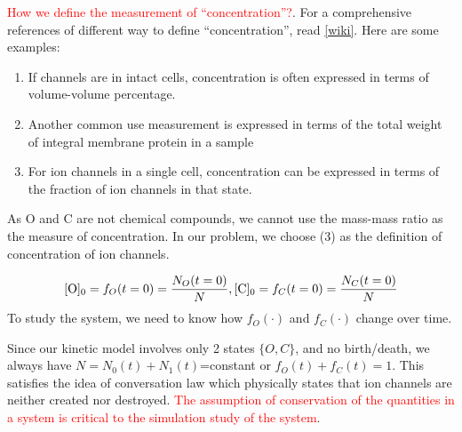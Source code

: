 % 
\begin{framed}
  
  
  \textcolor{red}{How we define the measurement of ``concentration''?}.
  For a comprehensive references of different way to define
  ``concentration'', read
  \href{http://en.wikipedia.org/wiki/Concentration}{[wiki]}. Here are
  some examples:

  \begin{enumerate}
  \item If channels are in intact cells, concentration is often
    expressed in terms of volume-volume percentage.

  \item Another common use measurement is expressed in terms of the
    total weight of integral membrane protein in a sample

  \item For ion channels in a single cell, concentration can be
    expressed in terms of the fraction of ion channels in that
    state.
  \end{enumerate}

\end{framed}

As O and C are not chemical compounds, we cannot use the mass-mass
ratio as the measure of concentration. In our problem, we choose (3)
as the definition of concentration of ion channels. 
% 

\begin{equation}
  \label{eq:9}
  [\text{O}]_0 = f_O(t=0) = \frac{N_O(t=0)}{N}, [{\text{C}}]_0 = f_C(t=0) =
  \frac{N_C(t=0)}{N}
\end{equation}
To study the system, we need to know how $f_O(\cdot)$ and
$f_C(\cdot)$ change over time.

\begin{mdframed}
Since our kinetic model involves only 2 states $\{O,C\}$, and no
birth/death, we always have $N = N_0(t) + N_1(t)$=constant or 
$f_O(t) + f_C(t) =1$. 
This satisfies the idea of conversation law which physically
states that ion channels are neither created nor
destroyed.
\textcolor{red}{The assumption of conservation of the quantities in
  a system is critical to the simulation study of the system}.
\end{mdframed}

